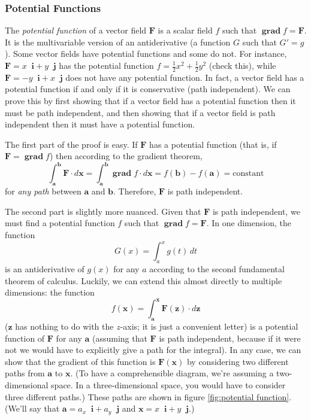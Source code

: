 \documentclass{myarticle}
\DeclareMathOperator{\grad}{\mathbf{grad}}
\renewcommand{\vec}[1]{\mathbf{#1}}
\newcommand{\unitvector}[1]{
  \mathop{}\!\vec{#1}
}
\newcommand{\ih}{\unitvector{i}}
\newcommand{\jh}{\unitvector{j}}
\theoremstyle{nospace}
\newtheorem{old series theorem}{Theorem}
\newenvironment{series theorem}{\begin{mdframed}\begin{old series theorem}}{\end{old series theorem}\end{mdframed}}
\begin{document}
\subsubsection{Potential Functions} \label{sec:potential functions}

The \textit{potential function} of a vector field $\vec{F}$ is a scalar field $f$ such that $\grad f = \vec{F}$. It is the multivariable version of an antiderivative (a function $G$ such that $G' = g$). Some vector fields have potential functions and some do not. For instance, $\vec{F} = x \ih + y \jh$ has the potential function $f = \frac{1}{2}x^2 + \frac{1}{2}y^2$ (check this), while $\vec{F} = -y \ih + x \jh$ does not have any potential function. In fact, a vector field has a potential function if and only if it is conservative (path independent). We can prove this by first showing that if a vector field has a potential function then it must be path independent, and then showing that if a vector field is path independent then it must have a potential function.

The first part of the proof is easy. If $\vec{F}$ has a potential function (that is, if $\vec{F} = \grad f$) then according to the gradient theorem, \[ \int_\vec{a}^\vec{b} \vec{F} \cdot d\vec{x} = \int_\vec{a}^\vec{b} \grad f \cdot d\vec{x} = f(\vec{b}) - f(\vec{a}) = \text{constant} \] for \textit{any path} between $\vec{a}$ and $\vec{b}$. Therefore, $\vec{F}$ is path independent.

The second part is slightly more nuanced. Given that $\vec{F}$ is path independent, we must find a potential function $f$ such that $\grad f = \vec{F}$. In one dimension, the function \[ G(x) = \int_a^x g(t) \,dt \] is an antiderivative of $g(x)$ for any $a$ according to the second fundamental theorem of calculus. Luckily, we can extend this almost directly to multiple dimensions: the function \[ f(\vec{x}) = \int_\vec{a}^\vec{x} \vec{F}(\vec{z}) \cdot d\vec{z} \] ($\vec{z}$ has nothing to do with the $z$-axis; it is just a convenient letter) is a potential function of $\vec{F}$ for any $\vec{a}$ (assuming that $\vec{F}$ is path independent, because if it were not we would have to explicitly give a path for the integral). In any case, we can show that the gradient of this function is $\vec{F}(\vec{x})$ by considering two different paths from $\vec{a}$ to $\vec{x}$. (To have a comprehensible diagram, we're assuming a two-dimensional space. In a three-dimensional space, you would have to consider three different paths.) These paths are shown in figure \ref{fig:potential function}. (We'll say that $\vec{a} = a_x \ih + a_y \jh$ and $\vec{x} = x \ih + y \jh$.)
\end{document}
